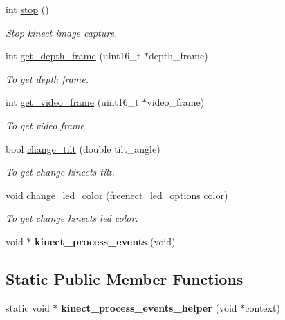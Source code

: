 \begin{DoxyCompactItemize}
\mbox{\label{classc_kinect_a83470a348d456bfac545d9fda46fa4ea}} 
int \mbox{\hyperlink{classc_kinect_a83470a348d456bfac545d9fda46fa4ea}{stop}} ()
\begin{DoxyCompactList}\small\item\em Stop kinect image capture. \end{DoxyCompactList}\item 
\mbox{\label{classc_kinect_a0310724aa56e573b78af7729d4e5b4a6}} 
int \mbox{\hyperlink{classc_kinect_a0310724aa56e573b78af7729d4e5b4a6}{get\+\_\+depth\+\_\+frame}} (uint16\+\_\+t $\ast$depth\+\_\+frame)
\begin{DoxyCompactList}\small\item\em To get depth frame. \end{DoxyCompactList}\item 
\mbox{\label{classc_kinect_af2a800d0a5ceb0e1d1eaecddbe57cb9c}} 
int \mbox{\hyperlink{classc_kinect_af2a800d0a5ceb0e1d1eaecddbe57cb9c}{get\+\_\+video\+\_\+frame}} (uint16\+\_\+t $\ast$video\+\_\+frame)
\begin{DoxyCompactList}\small\item\em To get video frame. \end{DoxyCompactList}\item 
bool \mbox{\hyperlink{classc_kinect_a729f69cc4f9bfd842775234955f75deb}{change\+\_\+tilt}} (double tilt\+\_\+angle)
\begin{DoxyCompactList}\small\item\em To get change kinect\textquotesingle{}s tilt. \end{DoxyCompactList}\item 
void \mbox{\hyperlink{classc_kinect_a5bfa1f57240d21a5c6b3947d663cf39f}{change\+\_\+led\+\_\+color}} (freenect\+\_\+led\+\_\+options color)
\begin{DoxyCompactList}\small\item\em To get change kinect\textquotesingle{}s led color. \end{DoxyCompactList}\item 
\mbox{\label{classc_kinect_a3348a5a741997580788f061a1518f2dc}} 
void $\ast$ {\bfseries kinect\+\_\+process\+\_\+events} (void)
\end{DoxyCompactItemize}
\subsection*{Static Public Member Functions}
\begin{DoxyCompactItemize}
\item 
\mbox{\label{classc_kinect_a3efc45bf431d7522dd5fba24c1049212}} 
static void $\ast$ {\bfseries kinect\+\_\+process\+\_\+events\+\_\+helper} (void $\ast$context)
\end{DoxyCompactItemize}
